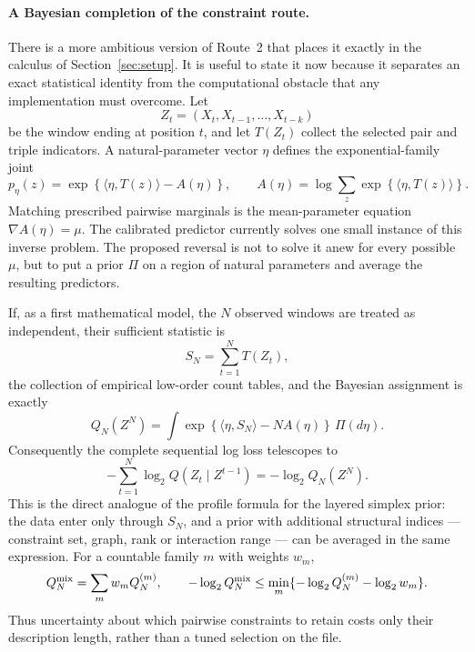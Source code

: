 \documentclass[11pt]{article}
\begin{document}
\paragraph{A Bayesian completion of the constraint route.}
There is a more ambitious version of Route~2 that places it exactly
in the calculus of Section~\ref{sec:setup}.  It is useful to state it
now because it separates an exact statistical identity from the
computational obstacle that any implementation must overcome.  Let
\[
  Z_t=(X_t,X_{t-1},\ldots,X_{t-k})
\]
be the window ending at position $t$, and let $T(Z_t)$ collect the
selected pair and triple indicators.  A natural-parameter vector
$\eta$ defines the exponential-family joint
\begin{equation}
\label{eq:future-exp-family}
  p_\eta(z)
  =\exp\!\left\{\langle\eta,T(z)\rangle-A(\eta)\right\},
  \qquad
  A(\eta)=\log\sum_z
       \exp\!\left\{\langle\eta,T(z)\rangle\right\}.
\end{equation}
Matching prescribed pairwise marginals is the mean-parameter equation
$\nabla A(\eta)=\mu$.  The calibrated predictor currently solves one
small instance of this inverse problem.  The proposed reversal is not
to solve it anew for every possible $\mu$, but to put a prior $\Pi$ on
a region of natural parameters and average the resulting predictors.

If, as a first mathematical model, the $N$ observed windows are
treated as independent, their sufficient statistic is
\[
  S_N=\sum_{t=1}^{N}T(Z_t),
\]
the collection of empirical low-order count tables, and the Bayesian
assignment is exactly
\begin{equation}
\label{eq:future-bayes-joint}
  Q_N(Z^N)
  =\int \exp\!\left\{
       \langle\eta,S_N\rangle-NA(\eta)
     \right\}\,\Pi(d\eta).
\end{equation}
Consequently the complete sequential log loss telescopes to
\begin{equation}
\label{eq:future-bayes-loss}
  -\sum_{t=1}^{N}\log_2 Q(Z_t\mid Z^{t-1})
  =-\log_2 Q_N(Z^N).
\end{equation}
This is the direct analogue of the profile formula for the layered
simplex prior: the data enter only through $S_N$, and a prior with
additional structural indices --- constraint set, graph, rank or
interaction range --- can be averaged in the same expression.  For a
countable family $m$ with weights $w_m$,
\begin{equation}
\label{eq:future-structure-mixture}
  Q_N^{\rm mix}=\sum_m w_m Q_N^{(m)},
  \qquad
  -\log_2 Q_N^{\rm mix}
  \leq \min_m\{-\log_2 Q_N^{(m)}-\log_2 w_m\}.
\end{equation}
Thus uncertainty about which pairwise constraints to retain costs
only their description length, rather than a tuned selection on the
file.
\end{document}
